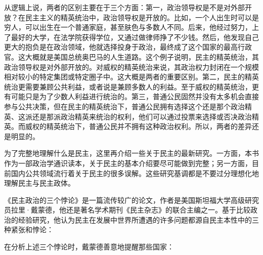 从逻辑上说，两者的区别主要在于三个方面：第一，政治领导权是不是对外部开放？在民主主义的精英统治中，政治领导权是开放的。比如，一个人出生时可以是穷人，可以出生在一个普通家庭，甚至肤色与多数人不同。后来，他经过努力，上了最好的大学，在法学院获得学位，又通过做律师挣了不少钱。然后，他发现自己更大的抱负是在政治领域，他就选择投身于政治，最终成了这个国家的最高行政官。这大概就是美国总统奥巴马的人生道路。这个例子说明，民主的精英统治，其政治领导权是对外部开放的。对威权的精英统治来说，其政治权力封闭在一个规模相对较小的特定集团或特定圈子中。这大概是两者的重要区别。第二，民主的精英统治更需要兼顾公共利益，或者说是兼顾多数人的利益。至于威权的精英统治，更有可能只是为了少数人利益进行统治的。第三，普通公民固然并没有太多机会直接参与公共决策，但在民主的精英统治下，普通公民拥有选择这个还是那个政治精英、这派还是那派政治精英来统治的权利，他们可以通过投票来选择或否决政治精英。而威权的精英统治下，普通公民并不拥有这种政治权利。所以，两者的差异还是明显的。


为了完整地理解什么是民主，这里再介绍一些关于民主的最新研究。一方面，本书作为一部政治学通识读本，关于民主的基本介绍要尽可能做到完整；另一方面，目前国内公共领域流行着关于民主的很多误解。这些研究基调都是不要过分理想化地理解民主与民主政体。

《民主政治的三个悖论》是一篇流传较广的论文，作者是美国斯坦福大学高级研究员拉里·戴蒙德，他还是著名学术期刊《民主杂志》的联合主编之一。基于比较政治的经验研究，他认为民主在发展中世界所遭遇的许多问题都源自民主本性中的三种紧张和悖论：


在分析上述三个悖论时，戴蒙德善意地提醒那些国家：

